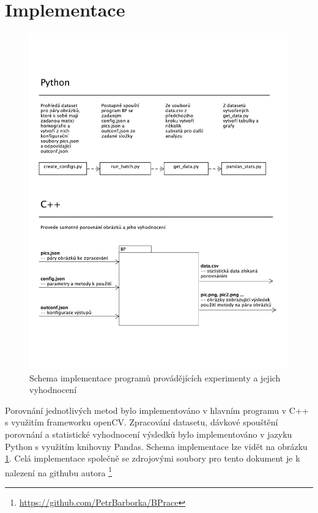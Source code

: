 

\section{Implementace}

\begin{figure}[!htp] 
	\centering
	\includegraphics[width=6in]{img/impl_uml.pdf}
	\caption{Schema implementace programů provádějících experimenty a jejich vyhodnocení} \label{impl_uml}
\end{figure}

Porovnání jednotlivých metod bylo implementováno v hlavním programu v C++ s využitím frameworku openCV. Zpracování datasetu, dávkové spouštění porovnání a statistické vyhodnocení výsledků bylo implementováno v jazyku Python s využitím knihovny Pandas. Schema implementace lze vidět na obrázku \ref{impl_uml}. Celá implementace společně se zdrojovými soubory pro tento dokument je k nalezení na githubu autora \footnote{\protect\url{https://github.com/PetrBarborka/BPrace}}

